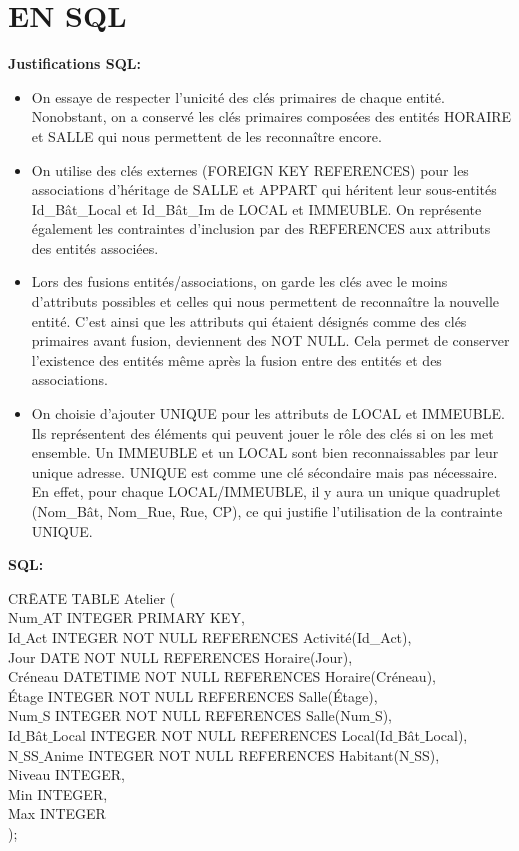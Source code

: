 \documentclass[a4paper,10.5pt]{report}
\begin{document}
	\newpage
	\section*{EN SQL}
	\textbf{Justifications SQL\@: }
	\begin{itemize}
		\item On essaye de respecter l'unicité des clés primaires de chaque entité. Nonobstant, on a conservé les clés primaires composées des entités HORAIRE et SALLE qui nous permettent de les reconnaître encore. 
		\item On utilise des clés externes (FOREIGN KEY REFERENCES) pour les associations d'héritage de SALLE et APPART qui héritent leur sous-entités Id\_Bât\_Local et Id\_Bât\_Im de LOCAL et IMMEUBLE\@. On représente également les contraintes d'inclusion par des REFERENCES aux attributs des entités associées.
		\item Lors des fusions entités/associations, on garde les clés avec le moins d'attributs possibles et celles qui nous permettent de reconnaître la nouvelle entité. C'est ainsi que les attributs qui étaient désignés comme des clés primaires avant fusion, deviennent des NOT NULL\@. Cela permet de conserver l'existence des entités même après la fusion entre des entités et des associations.
		\item On choisie d'ajouter UNIQUE pour les attributs de LOCAL et IMMEUBLE\@. Ils représentent des éléments qui peuvent jouer le rôle des clés si on les met ensemble. Un IMMEUBLE et un LOCAL sont bien reconnaissables par leur unique adresse. UNIQUE est comme une clé sécondaire mais pas nécessaire. En effet, pour chaque LOCAL/IMMEUBLE, il y aura un unique quadruplet (Nom\_Bât, Nom\_Rue, Rue, CP), ce qui justifie l'utilisation de la contrainte UNIQUE\@.
		 
	\end{itemize}
	\textbf{SQL: }
		\begin{tabbing}
			CR\=EATE TABLE Atelier (\\
			\> Num$\_$AT INTEGER PRIMARY KEY,\\
			\> Id$\_$Act INTEGER NOT NULL REFERENCES Activité(Id\_Act),\\
			\> Jour DATE NOT NULL REFERENCES Horaire(Jour),\\
			\> Créneau DATETIME NOT NULL REFERENCES Horaire(Créneau),\\
			\> Étage INTEGER NOT NULL REFERENCES Salle(Étage),\\
			\> Num$\_$S INTEGER NOT NULL REFERENCES Salle(Num$\_$S),\\
			\> Id$\_$Bât$\_$Local INTEGER NOT NULL REFERENCES Local(Id$\_$Bât$\_$Local),\\
			\> N$\_$SS$\_$Anime  INTEGER NOT NULL REFERENCES Habitant(N$\_$SS),\\
			\> Niveau INTEGER,\\
			\> Min INTEGER,\\
			\> Max INTEGER\\);
		\end{tabbing}
\end{document}
